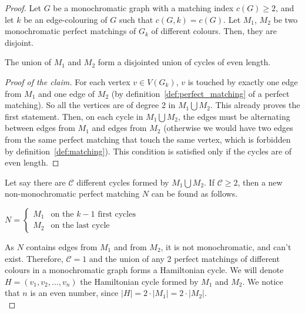 \begin{proof}
    Let $G$ be a monochromatic graph with a matching index $c(G) \geq 2$, and let $k$ be an edge-colouring of $G$ such that $c(G, k) = c(G)$.
    Let $M_1$, $M_2$ be two monochromatic perfect matchings of $G_k$ of different colours.
    Then, they are disjoint.
    
    \begin{claim}
        \label{clm:even_cycles}
        The union of $M_1$ and $M_2$ form a disjointed union of cycles of even length.
    \end{claim}
    
    \begin{proof}[Proof of the claim]
        For each vertex $v \in V(G_k)$, $v$ is touched by exactly one edge from $M_1$ and one edge of $M_2$ (by definition~\ref{def:perfect_matching} of a perfect matching).
        So all the vertices are of degree 2 in $M_1 \bigcup M_2$.
        This already proves the first statement.
        Then, on each cycle in $M_1 \bigcup M_2$, the edges must be alternating between edges from $M_1$ and edges from $M_2$ (otherwise we would have two edges from the same perfect matching that touch the same vertex, which is forbidden by definition~\ref{def:matching}).
        This condition is satisfied only if the cycles are of even length.
    \end{proof}
    
    Let say there are $\mathcal{C}$ different cycles formed by $M_1 \bigcup M_2$.
    If $\mathcal{C} \geq 2$, then a new non-monochromatic perfect matching $N$ can be found as follows.
    
    \begin{center}
        $N = \left\{
        \begin{array}{ll}
            M_1 & \mbox{on the } k - 1 \mbox{ first cycles} \\
            M_2 & \mbox{on the last cycle}
        \end{array}
        \right.$
    \end{center}

    As $N$ contains edges from $M_1$ and from $M_2$, it is not monochromatic, and can't exist.
    Therefore, $\mathcal{C} = 1$ and the union of any 2 perfect matchings of different colours in a monochromatic graph forms a Hamiltonian cycle.
    We will denote $H = (v_1, v_2, \dots, v_n)$ the Hamiltonian cycle formed by $M_1$ and $M_2$.
    We notice that $n$ is an even number, since $|H| = 2 \cdot |M_1| = 2 \cdot |M_2|$.\\


\end{proof}
